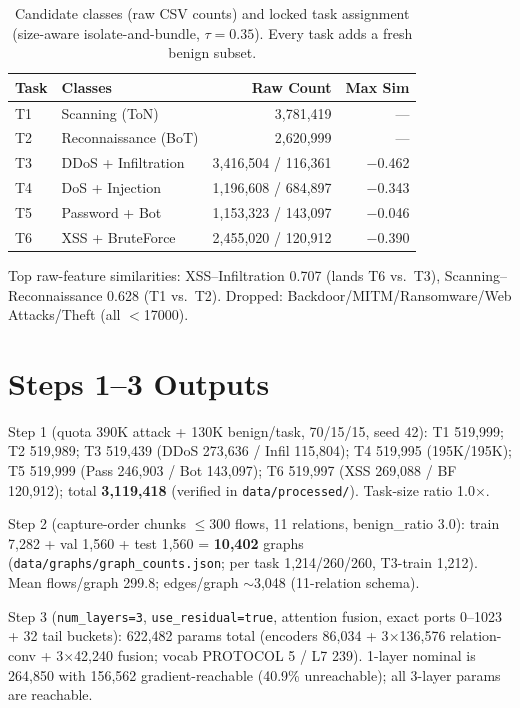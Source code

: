 \documentclass[10pt,a4paper,twocolumn]{article}
\begin{document}
\begin{table}[htbp]
\centering\footnotesize
\caption{Candidate classes (raw CSV counts) and locked task assignment (size-aware isolate-and-bundle, $\tau=0.35$). Every task adds a fresh benign subset.}
\label{tab:tasks}
\begin{tabular}{llrr}
\toprule
Task & Classes & Raw Count & Max Sim \\
\midrule
T1 & Scanning (ToN) & 3,781,419 & --- \\
T2 & Reconnaissance (BoT) & 2,620,999 & --- \\
T3 & DDoS + Infiltration & 3,416,504 / 116,361 & \num{-0.462} \\
T4 & DoS + Injection & 1,196,608 / 684,897 & \num{-0.343} \\
T5 & Password + Bot & 1,153,323 / 143,097 & \num{-0.046} \\
T6 & XSS + BruteForce & 2,455,020 / 120,912 & \num{-0.390} \\
\bottomrule
\end{tabular}
\end{table}
Top raw-feature similarities: XSS--Infiltration 0.707 (lands T6 vs.\ T3), Scanning--Reconnaissance 0.628 (T1 vs.\ T2). Dropped: Backdoor/MITM/Ransomware/Web Attacks/Theft (all $<$\num{17000}).

\section{Steps 1--3 Outputs}
Step 1 (quota 390K attack + 130K benign/task, 70/15/15, seed 42): T1 519,999; T2 519,989; T3 519,439 (DDoS 273,636 / Infil 115,804); T4 519,995 (195K/195K); T5 519,999 (Pass 246,903 / Bot 143,097); T6 519,997 (XSS 269,088 / BF 120,912); total \textbf{3,119,418} (verified in \texttt{data/processed/}). Task-size ratio 1.0$\times$.

Step 2 (capture-order chunks $\le$300 flows, 11 relations, benign\_ratio 3.0): train 7,282 + val 1,560 + test 1,560 = \textbf{10,402} graphs (\texttt{data/graphs/graph\_counts.json}; per task 1,214/260/260, T3-train 1,212). Mean flows/graph 299.8; edges/graph $\sim$3,048 (11-relation schema).

Step 3 (\texttt{num\_layers=3}, \texttt{use\_residual=true}, attention fusion, exact ports 0--1023 + 32 tail buckets): 622,482 params total (encoders 86,034 + 3$\times$136,576 relation-conv + 3$\times$42,240 fusion; vocab PROTOCOL 5 / L7 239). 1-layer nominal is 264,850 with 156,562 gradient-reachable (40.9\% unreachable); all 3-layer params are reachable.
\end{document}
